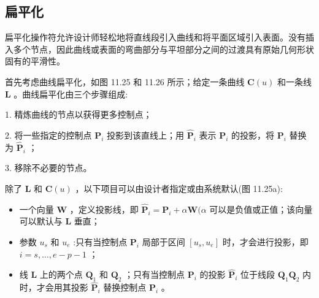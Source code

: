 \documentclass[../main.tex]{subfiles}
\begin{document}
\subsection{扁平化}

扁平化操作符允许设计师轻松地将直线段引入曲线和将平面区域引入表面。没有插入多个节点，因此曲线或表面的弯曲部分与平坦部分之间的过渡具有原始几何形状固有的平滑性。

首先考虑曲线扁平化，如图 11.25 和 11.26 所示；给定一条曲线 \(\mathbf{C}\left( u\right)\) 和一条线 \(\mathbf{L}\) 。曲线扁平化由三个步骤组成:



1. 精炼曲线的节点以获得更多控制点；

2. 将一些指定的控制点 \({\mathbf{P}}_{i}\) 投影到该直线上；用 \({\widehat{\mathbf{P}}}_{i}\) 表示 \({\mathbf{P}}_{i}\) 的投影，将 \({\mathbf{P}}_{i}\) 替换为 \({\widehat{\mathbf{P}}}_{i}\) ；

3. 移除不必要的节点。



除了 \(\mathbf{L}\) 和 \(\mathbf{C}\left( u\right)\) ，以下项目可以由设计者指定或由系统默认(图 11.25a):

\begin{itemize}
\item 一个向量 \(\mathbf{W}\) ，定义投影线，即 \({\widehat{\mathbf{P}}}_{i} = {\mathbf{P}}_{i} + \alpha \mathbf{W}(\alpha\) 可以是负值或正值；该向量可以默认与 \(\mathbf{L}\) 垂直；
\end{itemize}

\begin{itemize}
\item 参数 \({u}_{s}\) 和 \({u}_{e}\) :只有当控制点 \({\mathbf{P}}_{i}\) 局部于区间 \(\left\lbrack  {{u}_{s},{u}_{e}}\right\rbrack\) 时，才会进行投影，即 \(i = s,\ldots ,e - p - 1\) ；
\end{itemize}

\begin{itemize}
\item 线 \(\mathbf{L}\) 上的两个点 \({\mathbf{Q}}_{1}\) 和 \({\mathbf{Q}}_{2}\) ；只有当控制点 \({\mathbf{P}}_{i}\) 的投影 \({\widehat{\mathbf{P}}}_{i}\) 位于线段 \({\mathbf{Q}}_{1}{\mathbf{Q}}_{2}\) 内时，才会用其投影 \({\widehat{\mathbf{P}}}_{i}\) 替换控制点 \({\mathbf{P}}_{i}\) 。
\end{itemize}
\end{document}
